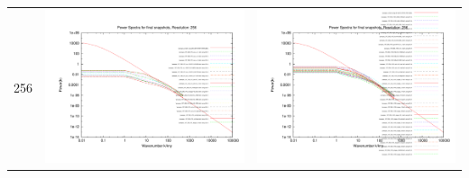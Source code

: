 \begin{itemize}
\begin{table}
\begin{tabular}{l|c|c}
 256 & \includegraphics[scale=0.2]{analysis/powerspectra/fin_powspec_combined_256_h70.pdf} & \includegraphics[scale=0.2]{analysis/powerspectra/fin_powspec_combined_256_h100.pdf} \\

\end{tabular}
\end{table}
\end{itemize}
